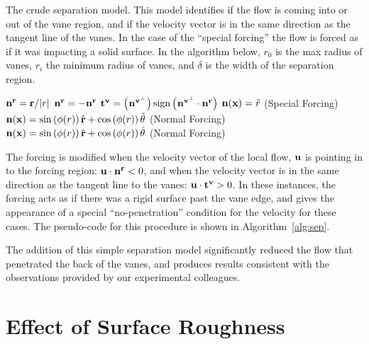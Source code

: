 \begin{center}
 \begin{algorithm}
  \caption{The crude separation model. This model identifies if the flow
  is coming into or out of the vane region, and if the velocity vector
  is in the same direction as the tangent line of the vanes. In the case
  of the ``special forcing'' the flow is forced as if it was
  impacting a solid surface. In the
  algorithm below, $r_0$ is the max radius of vanes, $r_i$ the minimum
  radius of vanes, and $\delta$ is the width of the separation region.}
  \label{alg:sep}
  \begin{algorithmic}
   \STATE ${\bf n^r} = {\bf r}/|r|$
   \STATE ${\bf n^r} = -{\bf n^r}$
   \ENDIF
   \STATE  $\bf t^v = \left( {\bf n^{v^\perp}} \right) \text{sign}\left(
  	    {\bf n^{v^\perp}} \cdot {\bf n^r} \right)$
   \STATE ${\bf n}({\bf x}) = \hat r$ \quad (Special Forcing)
   \ELSE
   \STATE  ${\bf n}({\bf x}) = \sin \left(\phi(r) \right) \hat{{\bf r}}+ \cos
  \left(\phi(r) \right) \hat{{\bf \theta}} $
  \quad (Normal Forcing)
   \ENDIF
   \ELSE
   \STATE ${\bf n}({\bf x}) = \sin \left(\phi(r) \right) \hat{{\bf r}}+ \cos
  \left(\phi(r) \right) \hat{{\bf \theta}} $
  \quad (Normal Forcing)
   \ENDIF
   \ENDIF
  \end{algorithmic}
 \end{algorithm}
\end{center}


The forcing is modified when the velocity vector of the local flow, $\bf
u$ is pointing in to the forcing region: ${\bf u} \cdot {\bf n^r} < 0$, and
when the velocity vector is in the same direction as the tangent line to
the vanes: ${\bf u} \cdot {\bf t^v} > 0 $. In these instances, the
forcing acts as if there was a rigid surface past the vane edge, and
gives the appearance of a special ``no-penetration'' condition for the
velocity for these cases. The pseudo-code for this procedure is shown in
Algorithm~\ref{alg:sep}.

The addition of this simple separation model significantly reduced the
flow that penetrated the back of the vanes, and produces results
consistent with the observations provided by our experimental
colleagues.  

\section{Effect of Surface Roughness}

